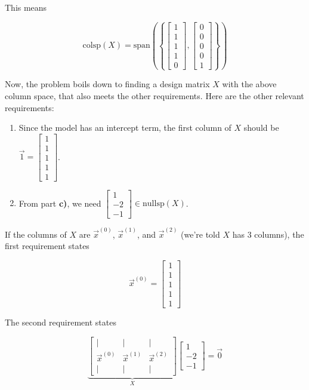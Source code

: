 \documentclass[11pt]{article}
\begin{document}
\begin{prob}[(19 pts)]
\begin{subprob}
\begin{solution}
This means

$$\text{colsp}(X) = \text{span}\left( \left\{ \begin{bmatrix} 1 \\ 1 \\ 1 \\ 1 \\ 0 \end{bmatrix}, \begin{bmatrix} 0 \\ 0 \\ 0 \\ 0 \\ 1 \end{bmatrix} \right\} \right)$$

Now, the problem boils down to finding a design matrix $X$ with the above column space, that also meets the other requirements. Here are the other relevant requirements:

\begin{enumerate}
\item Since the model has an intercept term, the first column of $X$ should be $\vec 1 = \begin{bmatrix} 1 \\ 1 \\ 1 \\ 1 \\ 1 \end{bmatrix}$.
\item From part \textbf{c)}, we need $\begin{bmatrix} 1 \\ -2 \\ -1 \end{bmatrix} \in \text{nullsp}(X)$.
\end{enumerate}

If the columns of $X$ are $\vec x^{(0)}$, $\vec x^{(1)}$, and $\vec x^{(2)}$ (we're told $X$ has 3 columns), the first requirement states

$$\vec x^{(0)} = \begin{bmatrix} 1 \\ 1 \\ 1 \\ 1 \\ 1 \end{bmatrix}$$

The second requirement states

$$\underbrace{\begin{bmatrix} | & | & | \\ \vec x^{(0)} & \vec x^{(1)} & \vec x^{(2)} \\ | & | & | \end{bmatrix}}_{X} \begin{bmatrix} 1 \\ -2 \\ -1 \end{bmatrix} = \vec 0$$


\end{solution}
\end{subprob}
\end{prob}
\end{document}
